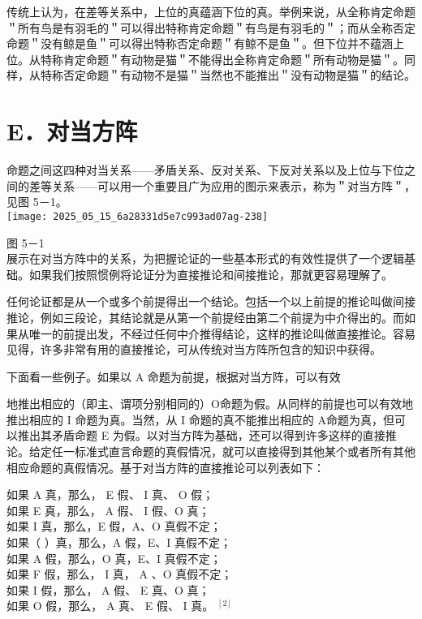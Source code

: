 传统上认为，在差等关系中，上位的真蕴涵下位的真。举例来说，从全称肯定命题＂所有鸟是有羽毛的＂可以得出特称肯定命题＂有鸟是有羽毛的＂；而从全称否定命题＂没有鲸是鱼＂可以得出特称否定命题＂有鲸不是鱼＂。但下位并不蕴涵上位。从特称肯定命题＂有动物是猫＂不能得出全称肯定命题＂所有动物是猫＂。同样，从特称否定命题＂有动物不是猫＂当然也不能推出＂没有动物是猫＂的结论。

\section*{E．对当方阵}
命题之间这四种对当关系——矛盾关系、反对关系、下反对关系以及上位与下位之间的差等关系——可以用一个重要且广为应用的图示来表示，称为＂对当方阵＂，见图 5－1。\\
\texttt{[image: 2025\_05\_15\_6a28331d5e7c993ad07ag-238]}

图 5－1\\
展示在对当方阵中的关系，为把握论证的一些基本形式的有效性提供了一个逻辑基础。如果我们按照惯例将论证分为直接推论和间接推论，那就更容易理解了。

任何论证都是从一个或多个前提得出一个结论。包括一个以上前提的推论叫做间接推论，例如三段论，其结论就是从第一个前提经由第二个前提为中介得出的。而如果从唯一的前提出发，不经过任何中介推得结论，这样的推论叫做直接推论。容易见得，许多非常有用的直接推论，可从传统对当方阵所包含的知识中获得。

下面看一些例子。如果以 A 命题为前提，根据对当方阵，可以有效

地推出相应的（即主、谓项分别相同的）O命题为假。从同样的前提也可以有效地推出相应的 I 命题为真。当然，从 I 命题的真不能推出相应的 A命题为真，但可以推出其矛盾命题 E 为假。以对当方阵为基础，还可以得到许多这样的直接推论。给定任一标准式直言命题的真假情况，就可以直接得到其他某个或者所有其他相应命题的真假情况。基于对当方阵的直接推论可以列表如下：

如果 A 真，那么， E 假、 I 真、 O 假；\\
如果 E 真，那么， A 假、 I 假、O 真；\\
如果 I 真，那么，E 假，A、O 真假不定；\\
如果（ ）真，那么，A 假，E、I 真假不定；\\
如果 A 假，那么，O 真，E、I 真假不定；\\
如果 F 假，那么， I 真， A 、O 真假不定；\\
如果 I 假，那么， A 假、 E 真、O 真；\\
如果 O 假，那么， A 真、 E 假、 I 真。 ${ }^{[2]}$

